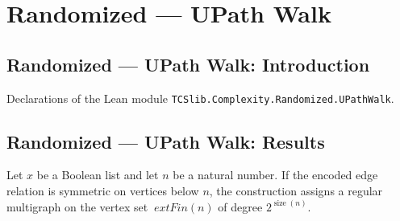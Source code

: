 \section{Randomized --- UPath Walk}
\subsection*{Randomized --- UPath Walk: Introduction}

Declarations of the Lean module \texttt{TCSlib.Complexity.Randomized.UPathWalk}.

\subsection*{Randomized --- UPath Walk: Results}

\begin{definition}
\label{Complexity.upGraph}
\leanok
{}
Let $x$ be a Boolean list and let $n$ be a natural number. If the encoded edge relation
is symmetric on vertices below $n$, the construction assigns a regular multigraph on the
vertex set $\	ext{Fin}(n)$ of degree $2^{\operatorname{size}(n)}$.
\end{definition}

